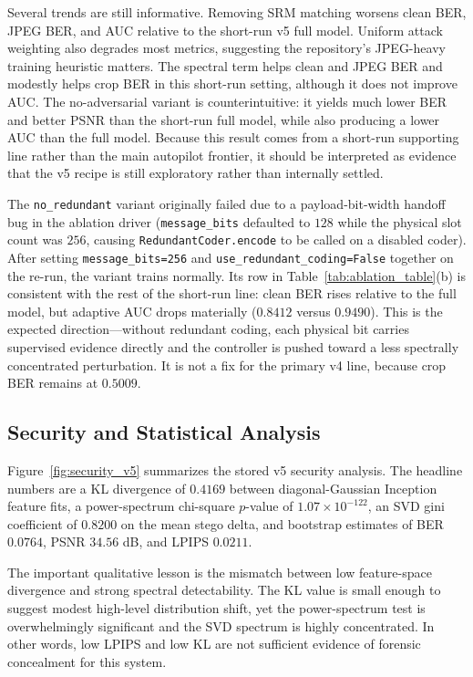 \documentclass[journal]{IEEEtran}
\begin{document}
Several trends are still informative. Removing SRM matching worsens clean BER, JPEG BER, and AUC relative to the short-run v5 full model. Uniform attack weighting also degrades most metrics, suggesting the repository's JPEG-heavy training heuristic matters. The spectral term helps clean and JPEG BER and modestly helps crop BER in this short-run setting, although it does not improve AUC. The no-adversarial variant is counterintuitive: it yields much lower BER and better PSNR than the short-run full model, while also producing a lower AUC than the full model. Because this result comes from a short-run supporting line rather than the main autopilot frontier, it should be interpreted as evidence that the v5 recipe is still exploratory rather than internally settled.

The \texttt{no\_redundant} variant originally failed due to a payload-bit-width handoff bug in the ablation driver (\texttt{message\_bits} defaulted to $128$ while the physical slot count was $256$, causing \texttt{RedundantCoder.encode} to be called on a disabled coder). After setting \texttt{message\_bits=256} and \texttt{use\_redundant\_coding=False} together on the re-run, the variant trains normally. Its row in Table~\ref{tab:ablation_table}(b) is consistent with the rest of the short-run line: clean BER rises relative to the full model, but adaptive AUC drops materially ($0.8412$ versus $0.9490$). This is the expected direction---without redundant coding, each physical bit carries supervised evidence directly and the controller is pushed toward a less spectrally concentrated perturbation. It is not a fix for the primary v4 line, because crop BER remains at $0.5009$.

\subsection{Security and Statistical Analysis}
\label{sec:security}
Figure~\ref{fig:security_v5} summarizes the stored v5 security analysis. The headline numbers are a KL divergence of $0.4169$ between diagonal-Gaussian Inception feature fits, a power-spectrum chi-square $p$-value of $1.07\times10^{-122}$, an SVD gini coefficient of $0.8200$ on the mean stego delta, and bootstrap estimates of BER $0.0764$, PSNR $34.56$ dB, and LPIPS $0.0211$.

The important qualitative lesson is the mismatch between low feature-space divergence and strong spectral detectability. The KL value is small enough to suggest modest high-level distribution shift, yet the power-spectrum test is overwhelmingly significant and the SVD spectrum is highly concentrated. In other words, low LPIPS and low KL are not sufficient evidence of forensic concealment for this system.
\end{document}
